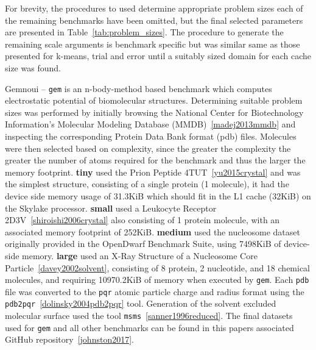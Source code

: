 \documentclass[../document.tex]{subfiles}
\begin{document}
For brevity, the procedures to used determine appropriate problem sizes each of the remaining benchmarks have been omitted, but the final selected parameters are presented in Table~\ref{tab:problem_sizes}.
The procedure to generate the remaining scale arguments is benchmark specific but was similar same as those presented for k-means, trial and error until a suitably sized domain for each cache size was found.

Gemnoui -- {\tt gem} is an n-body-method based benchmark which computes electrostatic potential of biomolecular structures.
Determining suitable problem sizes was performed by initially browsing the National Center for Biotechnology Information's Molecular Modeling Database (MMDB)~\ref{madej2013mmdb} and inspecting the corresponding Protein Data Bank format (pdb) files.
Molecules were then selected based on complexity, since the greater the complexity the greater the number of atoms required for the benchmark and thus the larger the memory footprint.
{\bf tiny} used the Prion Peptide 4TUT~\ref{yu2015crystal} and was the simplest structure, consisting of a single protein (1 molecule), it had the device side memory usage of 31.3KiB which should fit in the L1 cache (32KiB) on the Skylake processor.
{\bf small} used a Leukocyte Receptor 2D3V~\ref{shiroishi2006crystal} also consisting of 1 protein molecule, with an associated memory footprint of 252KiB.
{\bf medium} used the nucleosome dataset originally provided in the OpenDwarf Benchmark Suite, using 7498KiB of device-side memory.
{\bf large} used an X-Ray Structure of a Nucleosome Core Particle~\ref{davey2002solvent}, consisting of 8 protein, 2 nucleotide, and 18 chemical molecules, and requiring 10970.2KiB of memory when executed by {\tt gem}.
Each {\tt pdb} file was converted to the {\tt pqr} atomic particle charge and radius format using the {\tt pdb2pqr}~\ref{dolinsky2004pdb2pqr} tool.
Generation of the solvent excluded molecular surface used the tool {\tt msms}~\ref{sanner1996reduced}.
The final datasets used for {\tt gem} and all other benchmarks can be found in this papers associated GitHub repository~\ref{johnston2017}.
\end{document}
